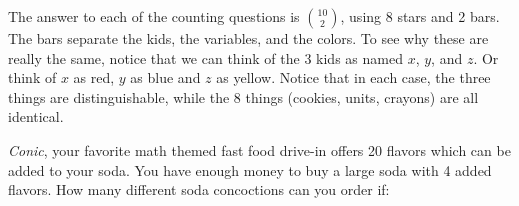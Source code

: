 \begin{questions}



	\begin{answer}
	  The answer to each of the counting questions is ${10 \choose 2}$, using 8 stars and 2 bars.  The bars separate the kids, the variables, and the colors.  To see why these are really the same, notice that we can think of the 3 kids as named $x$, $y$, and $z$.  Or think of $x$ as red, $y$ as blue and $z$ as yellow.  Notice that in each case, the three things are distinguishable, while the 8 things (cookies, units, crayons) are all identical.
	\end{answer}


	

\question \textit{Conic}, your favorite math themed fast food drive-in offers 20 flavors which can be added to your soda.  You have enough money to buy a large soda with 4 added flavors.  How many different soda concoctions can you order if:

  \begin{answer}
\end{answer}
\end{questions}
